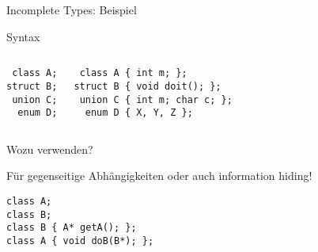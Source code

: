 \begin{frame}[fragile]{Incomplete Types: Beispiel}
	\begin{block}{Syntax}
		\begin{columns}[t]
			\begin{lstlisting}
 class A;
struct B;
 union C;
  enum D;
			\end{lstlisting}
			
			\begin{lstlisting}
 class A { int m; };
struct B { void doit(); };
 union C { int m; char c; };
  enum D { X, Y, Z };
			\end{lstlisting}
		\end{columns}
	\end{block}
	
	\pause
	\vspace{1em}
	
	Wozu verwenden?
	\pause
	
	Für gegenseitige Abhängigkeiten oder auch information hiding!
	\begin{lstlisting}
class A;
class B;
class B { A* getA(); };
class A { void doB(B*); };
	\end{lstlisting}
\end{frame}

